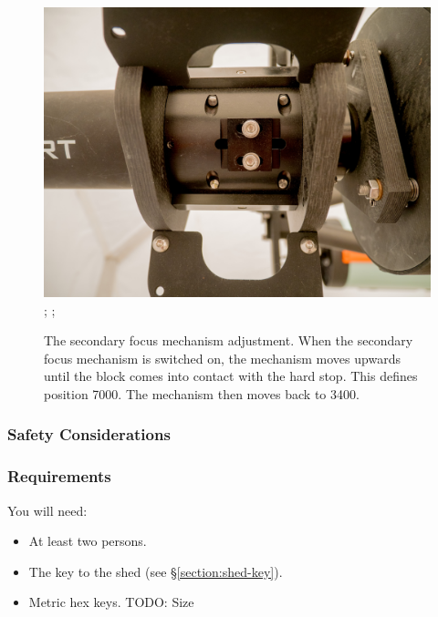 \begin{figure}
\begin{center}
\begin{labeled}{\includegraphics[width=0.8\linewidth]{figures/secondary-coatli-adjustment.jpg}}
;
;
\end{labeled}
\caption{The secondary focus mechanism adjustment. When the secondary focus mechanism is switched on, the mechanism moves upwards until the block comes into contact with the hard stop. This defines position 7000. The mechanism then moves back to 3400.}
\label{figure:secondary-adjustment}
\end{center}
\end{figure}

\subsubsection{Safety Considerations}


\subsubsection{Requirements}

You will need:
\begin{itemize}
\item At least two persons.
\item The key to the shed (see \S\ref{section:shed-key}).
\item Metric hex keys. TODO: Size
\end{itemize}

